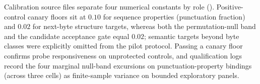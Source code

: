 Calibration source files separate four numerical constants by role
(). Positive-control canary floors sit at $0.10$ for sequence
properties (punctuation fraction) and $0.02$ for next-byte structure
targets, whereas both the permutation-null band and the candidate
acceptance gate equal $0.02$; semantic targets beyond byte classes were
explicitly omitted from the pilot protocol. Passing a canary floor confirms
probe responsiveness on unprotected controls, and qualification logs record
the four marginal null-band excursions on punctuation-property bindings
(across three cells) as finite-sample variance on bounded exploratory
panels.
